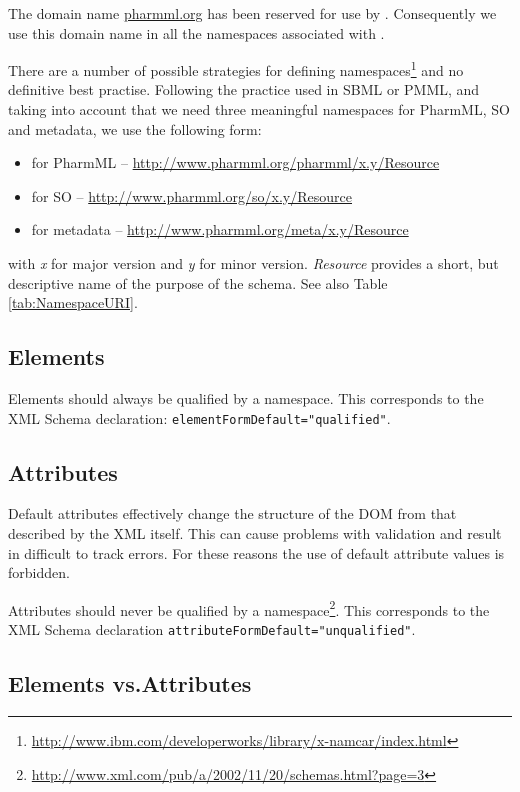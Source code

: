 The domain name \url{pharmml.org} has been reserved for use by
\pharmml. Consequently we use this domain name in all the namespaces
associated with \pharmml.

There are a number of possible strategies for defining
namespaces\footnote{\url{http://www.ibm.com/developerworks/library/x-namcar/index.html}}
and no definitive best practise. Following the practice used in SBML or PMML, 
and taking into account that we need three meaningful namespaces for 
PharmML, SO and metadata, we use the following form:
\begin{itemize}
\item
for PharmML -- \url{http://www.pharmml.org/pharmml/x.y/Resource}
\item
for SO -- \url{http://www.pharmml.org/so/x.y/Resource}
\item
for metadata -- \url{http://www.pharmml.org/meta/x.y/Resource}
\end{itemize}
with \emph{x} for major version and \emph{y} for minor version.
\emph{Resource} provides a short, but descriptive name of the purpose
of the schema. See also Table \ref{tab:NamespaceURI}.

\subsection{Elements}

Elements should always be qualified by a namespace. This corresponds
to the XML Schema declaration: \verb|elementFormDefault="qualified"|.

\subsection{Attributes}

Default attributes effectively change the structure of the DOM from
that described by the XML itself. This can cause problems with
validation and result in difficult to track errors. 
For these reasons the use of default attribute values is forbidden.

Attributes should never be qualified by a
namespace\footnote{\url{http://www.xml.com/pub/a/2002/11/20/schemas.html?page=3}}. This
corresponds to the XML Schema declaration
\verb|attributeFormDefault="unqualified"|.

\subsection{Elements vs.\@ Attributes}

